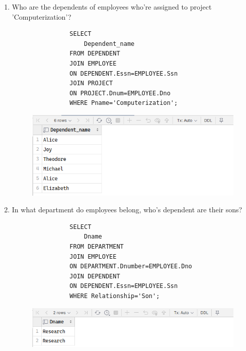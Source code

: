 \documentclass[12pt,titlepage]{article}
\begin{document}
\begin{enumerate}[label=\Alph*.]
{\begin{enumerate}[label={\arabic*.}]
{                \begin{figure}[h]
                    \centering
                    \texttt{[image: ./images/output\_8.png]}
                \end{figure}
            }
            \item {
                Who are the dependents of employees who're assigned to project 'Computerization'?

                \begin{verbatim}
                SELECT
                    Dependent_name
                FROM DEPENDENT
                JOIN EMPLOYEE
                ON DEPENDENT.Essn=EMPLOYEE.Ssn
                JOIN PROJECT
                ON PROJECT.Dnum=EMPLOYEE.Dno
                WHERE Pname='Computerization';
                \end{verbatim}

                \begin{figure}[h]
                    \centering
                    \includegraphics[width=.8\textwidth]{./images/output_9.png}
                \end{figure}
            }
            \pagebreak
            \item {
                In what department do employees belong, who's dependent are their sons?

                \begin{verbatim}
                SELECT
                    Dname
                FROM DEPARTMENT
                JOIN EMPLOYEE
                ON DEPARTMENT.Dnumber=EMPLOYEE.Dno
                JOIN DEPENDENT
                ON DEPENDENT.Essn=EMPLOYEE.Ssn
                WHERE Relationship='Son';
                \end{verbatim}

                \begin{figure}[h]
                    \centering
                    \includegraphics[width=.8\textwidth]{./images/output_10.png}
                \end{figure}
            }
        \end{enumerate}
    }
\end{enumerate}
\end{document}
